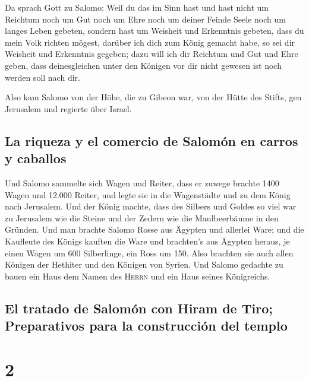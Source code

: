  Da sprach Gott zu Salomo: Weil du das im Sinn hast und
hast nicht um Reichtum noch um Gut noch um Ehre noch um deiner Feinde
Seele noch um langes Leben gebeten, sondern hast um Weisheit und
Erkenntnis gebeten, dass du mein Volk richten mögest, darüber ich dich
zum König gemacht habe,  so sei dir Weisheit und
Erkenntnis gegeben; dazu will ich dir Reichtum und Gut und Ehre geben,
dass deinesgleichen unter den Königen vor dir nicht gewesen ist noch
werden soll nach dir.

 Also kam Salomo von der Höhe, die zu Gibeon war, von der
Hütte des Stifts, gen Jerusalem und regierte über Israel.

\hypertarget{la-riqueza-y-el-comercio-de-salomuxf3n-en-carros-y-caballos}{%
\subsection{La riqueza y el comercio de Salomón en carros y
caballos}\label{la-riqueza-y-el-comercio-de-salomuxf3n-en-carros-y-caballos}}

 Und Salomo sammelte sich Wagen und Reiter, dass er
zuwege brachte 1400 Wagen und 12.000 Reiter, und legte sie in die
Wagenstädte und zu dem König nach Jerusalem.  Und der
König machte, dass des Silbers und Goldes so viel war zu Jerusalem wie
die Steine und der Zedern wie die Maulbeerbäume in den Gründen.
 Und man brachte Salomo Rosse aus Ägypten und allerlei
Ware; und die Kaufleute des Königs kauften die Ware  und
brachten's aus Ägypten heraus, je einen Wagen um 600 Silberlinge, ein
Ross um 150. Also brachten sie auch allen Königen der Hethiter und den
Königen von Syrien.  Und Salomo gedachte zu bauen ein
Haus dem Namen des \textsc{Herrn} und ein Haus seines Königreichs.

\hypertarget{el-tratado-de-salomuxf3n-con-hiram-de-tiro-preparativos-para-la-construcciuxf3n-del-templo}{%
\subsection{El tratado de Salomón con Hiram de Tiro; Preparativos para
la construcción del
templo}\label{el-tratado-de-salomuxf3n-con-hiram-de-tiro-preparativos-para-la-construcciuxf3n-del-templo}}

\hypertarget{section-1}{%
\section{2}\label{section-1}}

